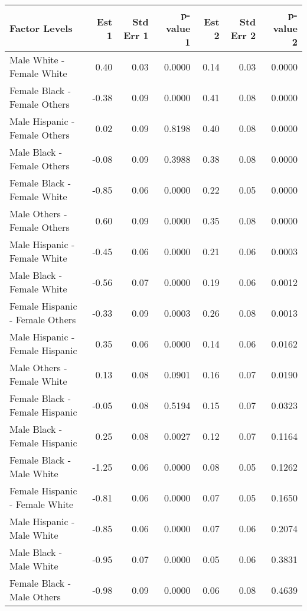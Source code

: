 \documentclass[11pt]{extarticle} %
\begin{document}
\begin{table}[H]
\footnotesize
\centering
\begin{tabular}{lrrrrrr}
  \hline
Factor Levels & Est 1 & Std Err 1 & p-value 1 & Est 2 & Std Err 2 & p-value 2 \\ 
  \hline
  Male White -  Female White & 0.40 & 0.03 & 0.0000 & 0.14 & 0.03 & 0.0000 \\ 
    Female Black -  Female Others & -0.38 & 0.09 & 0.0000 & 0.41 & 0.08 & 0.0000 \\ 
    Male Hispanic -  Female Others & 0.02 & 0.09 & 0.8198 & 0.40 & 0.08 & 0.0000 \\ 
    Male Black -  Female Others & -0.08 & 0.09 & 0.3988 & 0.38 & 0.08 & 0.0000 \\ 
    Female Black -  Female White & -0.85 & 0.06 & 0.0000 & 0.22 & 0.05 & 0.0000 \\ 
    Male Others -  Female Others & 0.60 & 0.09 & 0.0000 & 0.35 & 0.08 & 0.0000 \\ 
    Male Hispanic -  Female White & -0.45 & 0.06 & 0.0000 & 0.21 & 0.06 & 0.0003 \\ 
    Male Black -  Female White & -0.56 & 0.07 & 0.0000 & 0.19 & 0.06 & 0.0012 \\ 
    Female Hispanic -  Female Others & -0.33 & 0.09 & 0.0003 & 0.26 & 0.08 & 0.0013 \\ 
    Male Hispanic -  Female Hispanic & 0.35 & 0.06 & 0.0000 & 0.14 & 0.06 & 0.0162 \\ 
    Male Others -  Female White & 0.13 & 0.08 & 0.0901 & 0.16 & 0.07 & 0.0190 \\ 
    Female Black -  Female Hispanic & -0.05 & 0.08 & 0.5194 & 0.15 & 0.07 & 0.0323 \\ 
    Male Black -  Female Hispanic & 0.25 & 0.08 & 0.0027 & 0.12 & 0.07 & 0.1164 \\ 
    Female Black -  Male White & -1.25 & 0.06 & 0.0000 & 0.08 & 0.05 & 0.1262 \\ 
    Female Hispanic -  Female White & -0.81 & 0.06 & 0.0000 & 0.07 & 0.05 & 0.1650 \\ 
    Male Hispanic -  Male White & -0.85 & 0.06 & 0.0000 & 0.07 & 0.06 & 0.2074 \\ 
    Male Black -  Male White & -0.95 & 0.07 & 0.0000 & 0.05 & 0.06 & 0.3831 \\ 
    Female Black -  Male Others & -0.98 & 0.09 & 0.0000 & 0.06 & 0.08 & 0.4639 \\ 

\end{tabular}
\end{table}
\end{document}
